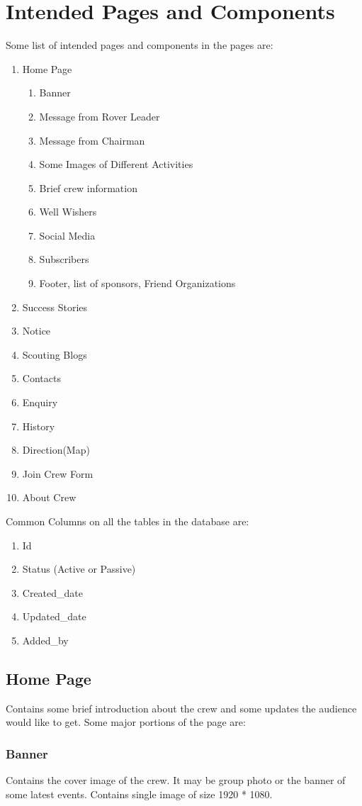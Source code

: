 	\section{Intended Pages and Components}
		Some list of intended pages and components in the pages are:
		\begin{enumerate}
			\item Home Page
			\begin{enumerate}
				\item Banner
				\item Message from Rover Leader
				\item Message from Chairman
				\item Some Images of Different Activities
				\item Brief crew information
				\item Well Wishers
				\item Social Media
				\item Subscribers
				\item Footer, list of sponsors, Friend Organizations
			\end{enumerate}
			\item Success Stories
			\item Notice
			\item Scouting Blogs
			\item Contacts
			\item Enquiry
			\item History
			\item Direction(Map)
			\item Join Crew Form
			\item About Crew
		\end{enumerate}
		Common Columns on all the tables in the database are:
		\begin{enumerate}
			\item Id
			\item Status (Active or Passive)
			\item Created\_date 
			\item Updated\_date 
			\item Added\_by
		\end{enumerate}
		\subsection{Home Page}
		Contains some brief introduction about the crew and some updates the audience would like to get. Some major portions of the page are:
			\subsubsection{Banner}
				Contains the cover image of the crew. It may be group photo or the banner of some latest events. Contains single image of size 1920 * 1080.
